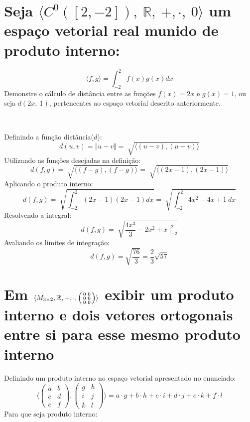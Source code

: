 \documentclass[12pt, twoside, a4]{article} %
\begin{document}
\section{Seja $\langle C^0 ([2,-2]),\ \mathbb{R},\ +, \cdot, \ 0  \rangle $
 um espaço vetorial real munido de produto interno: }
\begin{Large}
        \begin{bf}
        \[ \langle f, g  \rangle = \int_{-2}^{2} f(x)g(x)dx \]  
        Demonstre o cálculo de distância entre as funções $ f(x) = 2x $ e $ g(x) = 1 $,
        ou seja $d(2x,\ 1)$,
        pertencentes ao espaço vetorial descrito anteriormente.  

    \end{bf}
\end{Large}
\

Definindo a função distância($ d $):
    \[ d (u, v) = \Vert u - v \Vert = \sqrt[]{\langle (u - v), (u - v) \rangle} \]
Utilizando as funções desejadas na definição:
    \[ d(f, g) = \sqrt[]{\langle (f - g), (f - g) \rangle} =  \sqrt[]{\langle (2x - 1), (2x - 1) \rangle}\]
Aplicando o produto interno:
    \[ d(f, g) = \sqrt[]{\int_{-2}^{2} (2x - 1)(2x - 1)dx} = \sqrt[]{\int_{-2}^{2} 4x^2 -4x + 1 \ dx} \]
Resolvendo a integral:   
    \[ d(f, g) = \sqrt[]{ \frac{4 x^3}{3} -2x^2 + x \ \Big\vert_{-2}^{2}} \]
Avaliando os limites de integração:
    \[ d(f, g) = \sqrt{ \frac{76}{3} } = \frac{2}{3} \sqrt{57} \]

\section{Em $\langle M_{3 \times 2}, \mathbb{R}, +, \cdot,
\begin{psmallmatrix} 
 0 & 0 \\
 0 & 0 \\
 0 & 0
\end{psmallmatrix} \rangle 
$ exibir um produto interno e dois vetores ortogonais entre si para esse mesmo produto interno}

Definindo um produto interno no espaço vetorial apresentado no enunciado:
    \[ \langle \begin{pmatrix} 
        a & b \\
        c & d \\
        e & f
       \end{pmatrix} ,\begin{pmatrix} 
        g & h \\
        i & j \\
        k & l
       \end{pmatrix} \rangle =  a \cdot  g + b \cdot h +
       c \cdot i + d \cdot j +
       e \cdot k + f  \cdot l 
        \]
Para que seja produto interno: 
\end{document}
